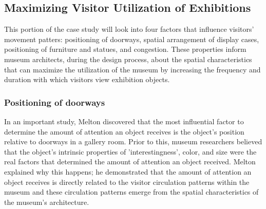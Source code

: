\documentclass[12pt]{ucthesis}
\begin{document}
\subsection{Maximizing Visitor Utilization of Exhibitions}
This portion of the case study will look into four factors that influence visitors' movement patters: positioning of doorways, spatial arrangement of display cases, positioning of furniture and statues, and congestion. These properties inform museum architects, during the design process, about the spatial characteristics that can maximize the utilization of the museum by increasing the frequency and duration with which visitors view exhibition objects. 

\subsubsection{Positioning of doorways}
In an important study, Melton \cite{Melton} discovered that the most influential factor to determine  the amount of attention an object receives is the object's position relative to doorways in a gallery room. Prior to this, museum researchers believed that the object's intrinsic properties of 'interestingness', color, and size were the real factors that determined the amount of attention an object received. Melton explained why this happens; he demonstrated that the amount of attention an object receives is directly related to the visitor circulation patterns within the museum and these circulation patterns emerge from the spatial characteristics of the museum's architecture.
\end{document}
